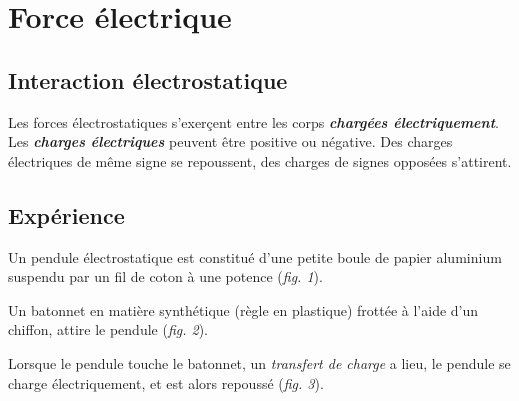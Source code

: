 
\section{Force électrique}
%
\subsection{Interaction électrostatique}
Les forces électrostatiques s'exerçent entre les corps \textbf{\textit {chargées électriquement}}. Les \textbf{\textit {charges électriques}} peuvent être positive ou négative.
Des charges électriques de même signe se repoussent, des charges de signes opposées s'attirent.

\subsection{Expérience}
Un pendule électrostatique est constitué d'une petite boule de papier aluminium suspendu par un fil de coton à une potence ({\it fig. 1}).
 
Un batonnet en matière synthétique (règle en plastique) frottée à l'aide d'un chiffon, attire le pendule ({\it fig. 2}).

Lorsque le pendule touche le batonnet, un {\it transfert de charge} a lieu, le pendule se charge électriquement, et est alors repoussé ({\it fig. 3}).

